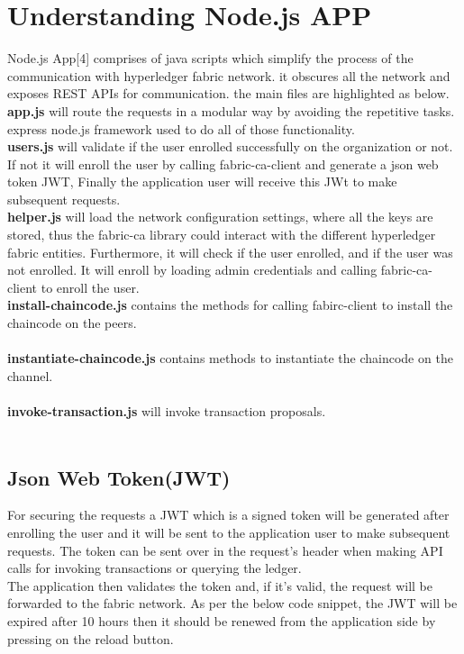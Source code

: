 \section{Understanding Node.js APP} 
Node.js App[4] comprises of java scripts which simplify the process of the communication with hyperledger fabric network. it obscures all the network and exposes REST APIs for communication. the main files are highlighted as below. 
\ \\ 
\textbf{app.js} will route the requests in a modular way by avoiding the repetitive tasks. express node.js framework used to do all of those functionality. 
\ \\ 
\textbf{users.js} will validate if the user enrolled successfully on the organization or not. If not it will enroll the user by calling fabric-ca-client and generate a  json web token JWT, Finally the application user will receive this JWt to make subsequent requests. 
\ \\ 
\textbf{helper.js} will load the network configuration settings, where all the keys are stored, thus the fabric-ca library could interact with the different hyperledger fabric entities. Furthermore, it will check if the user enrolled, and if the user was not enrolled.  It will enroll by loading admin credentials and calling fabric-ca-client to enroll the user.
\ \\ 
\textbf{install-chaincode.js} contains the methods for calling fabirc-client to install the chaincode on the peers.  \\ 
\ \\ 
\textbf{instantiate-chaincode.js} contains methods to instantiate the chaincode on the channel.  \\ 
\ \\  
\textbf{invoke-transaction.js} will invoke transaction proposals. \\
\ \\

\subsection{ Json Web Token(JWT) }
For securing the requests a JWT which is a signed token will be generated after enrolling the user and it will be sent to the application user to make subsequent requests.
The token can be sent over in the request's header when making API calls for invoking transactions or querying the ledger.\\ 
The application then validates the token and, if it’s valid, the request will be forwarded to the fabric network.
As per the below code snippet, the JWT will be expired after 10 hours then it should be renewed from the application side by pressing on the reload button.  \\ 

